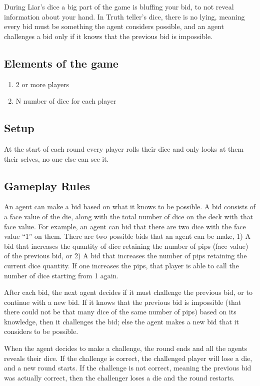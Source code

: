 \documentclass{article}
\begin{document}
During Liar's dice a big part of the game is bluffing your bid, to not reveal information about your hand. In Truth teller's dice, there is no lying, meaning every bid must be something the agent considers possible, and an agent challenges a bid only if it knows that the previous bid is impossible.

\subsection*{Elements of the game} %
\begin{enumerate}
    \item 2 or more players
    \item N number of dice for each player
\end{enumerate}
\subsection*{Setup} %
At the start of each round every player rolls their dice and only looks at them their selves, no one else can see it.

\subsection*{Gameplay Rules} %
An agent can make a bid based on what it knows to be possible. A bid consists of a face value of the die, along with the total number of dice on the deck with that face value. For example, an agent can bid that there are two dice with the face value “1” on them. There are two possible bids that an agent can be make, 1) A bid that increases the quantity of dice retaining the number of pips (face value) of the previous bid, or 2) A bid that increases the number of pips retaining the current dice quantity. If one increases the pips, that player is able to call the number of dice starting from 1 again.

After each bid, the next agent decides if it must challenge the previous bid, or to continue with a new bid. If it knows that the previous bid is impossible (that there could not be that many dice of the same number of pips) based on its knowledge, then it challenges the bid; else the agent makes a new bid that it considers to be possible. 

When the agent decides to make a challenge, the round ends and all the agents reveals their dice. If the challenge is correct, the challenged player will lose a die, and a new round starts. If the challenge is not correct, meaning the previous bid was actually correct, then the challenger loses a die and the round restarts.
\end{document}
